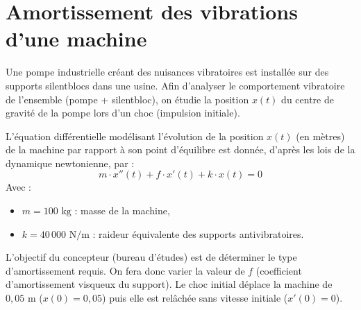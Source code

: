 \documentclass[a4paper,11pt]{article}
\begin{document}
\section{Amortissement des vibrations d'une machine}

Une pompe industrielle créant des nuisances vibratoires est installée sur des supports silentblocs dans une usine. Afin d'analyser le comportement vibratoire de l'ensemble (pompe + silentbloc), on étudie la position $x(t)$ du centre de gravité de la pompe lors d'un choc (impulsion initiale).

L'équation différentielle modélisant l'évolution de la position $x(t)$ (en mètres) de la machine par rapport à son point d'équilibre est donnée, d'après les lois de la dynamique newtonienne, par :
\[
m\cdot x''(t) + f\cdot x'(t) + k\cdot x(t) = 0
\]
Avec :
\begin{itemize}[label=--]
    \item $m = 100 \text{ kg}$ : masse de la machine,
    \item $k = 40\,000 \text{ N/m}$ : raideur équivalente des supports antivibratoires.
\end{itemize}

L'objectif du concepteur (bureau d'études) est de déterminer le type d'amortissement requis. On fera donc varier la valeur de $f$ (coefficient d'amortissement visqueux du support). 
Le choc initial déplace la machine de $0,05 \text{ m}$ ($x(0) = 0,05$) puis elle est relâchée sans vitesse initiale ($x'(0) = 0$).
\end{document}
